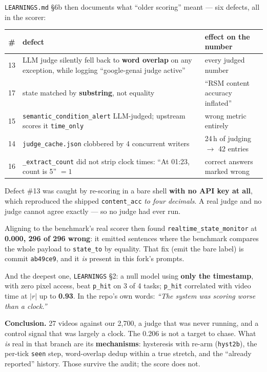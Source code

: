 \documentclass[11pt,a4paper]{article}
\newenvironment{keybox}{\begin{shaded}\noindent}{\end{shaded}}
\begin{document}
\texttt{LEARNINGS.md} \S6b then documents what ``older scoring'' meant --- six defects, all
in the scorer:

\begin{center}\small
\begin{tabular}{clp{7.6cm}}
\toprule
\# & defect & effect on the number \\
\midrule
13 & LLM judge silently fell back to \textbf{word overlap} on any exception, while logging
``google-genai judge active'' & every judged number \\
17 & state matched by \textbf{substring}, not equality & ``RSM content accuracy inflated'' \\
15 & \texttt{semantic\_condition\_alert} LLM-judged; upstream scores it \texttt{time\_only}
& wrong metric entirely \\
14 & \texttt{judge\_cache.json} clobbered by 4 concurrent writers & 24\,h of judging
$\rightarrow$ 42 entries \\
16 & \texttt{\_extract\_count} did not strip clock times: ``At 01:23, count is 5'' $=1$ &
correct answers marked wrong \\
\bottomrule
\end{tabular}
\end{center}

Defect \#13 was caught by re-scoring in a bare shell \textbf{with no API key at all}, which
reproduced the shipped \texttt{content\_acc} \emph{to four decimals}. A real judge and no
judge cannot agree exactly --- so no judge had ever run.

Aligning to the benchmark's real scorer then found \texttt{realtime\_state\_monitor} at
\textbf{0.000, 296 of 296 wrong}: it emitted sentences where the benchmark compares the
whole payload to \texttt{state\_to} by equality. That fix (emit the bare label) is commit
\texttt{ab49ce9}, and it \emph{is} present in this fork's prompts.

And the deepest one, \texttt{LEARNINGS} \S2: a null model using \textbf{only the timestamp},
with zero pixel access, beat \texttt{p\_hit} on 3 of 4 tasks; \texttt{p\_hit} correlated with
video time at $|r|$ up to \textbf{0.93}. In the repo's own words: \emph{``The system was
scoring worse than a clock.''}

\begin{keybox}
\textbf{Conclusion.} 27 videos against our 2{,}700, a judge that was never running, and a
control signal that was largely a clock. The 0.206 is not a target to chase. What \emph{is}
real in that branch are its \textbf{mechanisms}: hysteresis with re-arm (\texttt{hyst2b}),
the per-tick \texttt{seen} step, word-overlap dedup within a true stretch, and the
``already reported'' history. Those survive the audit; the score does not.
\end{keybox}
\end{document}
